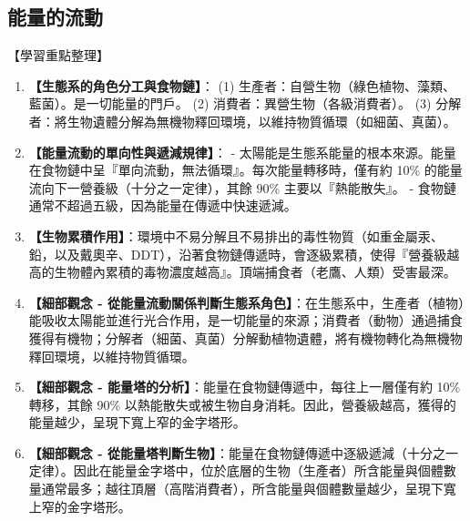 \documentclass[11pt,a4paper]{article}
\begin{document}
\subsection{能量的流動}
\begin{learningpoints}{【學習重點整理】}
\begin{enumerate}[label=\arabic*.]
  \item \textbf{【生態系的角色分工與食物鏈】}：
  (1) 生產者：自營生物（綠色植物、藻類、藍菌）。是一切能量的門戶。
  (2) 消費者：異營生物（各級消費者）。
  (3) 分解者：將生物遺體分解為無機物釋回環境，以維持物質循環（如細菌、真菌）。
  \item \textbf{【能量流動的單向性與遞減規律】}：
  - 太陽能是生態系能量的根本來源。能量在食物鏈中呈『單向流動，無法循環』。每次能量轉移時，僅有約 10\% 的能量流向下一營養級（十分之一定律），其餘 90\% 主要以『熱能散失』。
  - 食物鏈通常不超過五級，因為能量在傳遞中快速遞減。
  \item \textbf{【生物累積作用】}：環境中不易分解且不易排出的毒性物質（如重金屬汞、鉛，以及戴奧辛、DDT），沿著食物鏈傳遞時，會逐級累積，使得『營養級越高的生物體內累積的毒物濃度越高』。頂端捕食者（老鷹、人類）受害最深。
  \item \textbf{【細部觀念 - 從能量流動關係判斷生態系角色】}：在生態系中，生產者（植物）能吸收太陽能並進行光合作用，是一切能量的來源；消費者（動物）通過捕食獲得有機物；分解者（細菌、真菌）分解動植物遺體，將有機物轉化為無機物釋回環境，以維持物質循環。
  \item \textbf{【細部觀念 - 能量塔的分析】}：能量在食物鏈傳遞中，每往上一層僅有約 10\% 轉移，其餘 90\% 以熱能散失或被生物自身消耗。因此，營養級越高，獲得的能量越少，呈現下寬上窄的金字塔形。
  \item \textbf{【細部觀念 - 從能量塔判斷生物】}：能量在食物鏈傳遞中逐級遞減（十分之一定律）。因此在能量金字塔中，位於底層的生物（生產者）所含能量與個體數量通常最多；越往頂層（高階消費者），所含能量與個體數量越少，呈現下寬上窄的金字塔形。
\end{enumerate}
\end{learningpoints}
\end{document}
